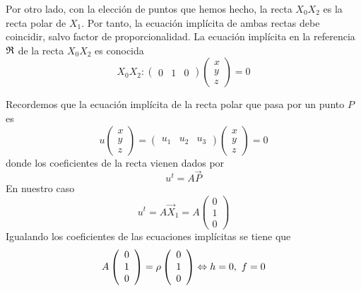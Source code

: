 Por otro lado, con la elección de puntos que hemos hecho, la recta $X_0X_2$ es la recta polar de $X_1$. Por tanto, la ecuación implícita de ambas rectas debe coincidir, salvo factor de proporcionalidad. La ecuación implícita en la referencia $\mathfrak{R}$ de la recta $X_0X_2$ es conocida 
\begin{equation*}
	X_0X_2:
	\begin{pmatrix}
		0 & 1& 0
	\end{pmatrix}
	\left( \begin{array}{c}
		x\\y\\z
	\end{array}\right)=0
\end{equation*}

Recordemos que la ecuación implícita de la recta polar que pasa por un punto $P$ es
\begin{equation*}
	u\left( \begin{array}{c}
	x\\y\\z
	\end{array}\right)=
	\begin{pmatrix}
	u_1 & u_2 & u_3
	\end{pmatrix}
	\left( \begin{array}{c}
	x\\y\\z
	\end{array}\right)=0
\end{equation*}
donde los coeficientes de la recta vienen dados por 
\begin{equation*}
	u^t=A\vec{P}
\end{equation*}
En nuestro caso
\begin{equation*}
u^t=A\vec{X}_1=A\left( \begin{array}{c}
	0\\1\\0
\end{array}\right)
\end{equation*}
Igualando los coeficientes de las ecuaciones implícitas se tiene que
\begin{equation*}
	A\left( \begin{array}{c}
	0\\1\\0
	\end{array}\right)=\rho \left( \begin{array}{c}
	0\\1\\0
	\end{array}\right)\Leftrightarrow h=0, \ f=0
\end{equation*}
